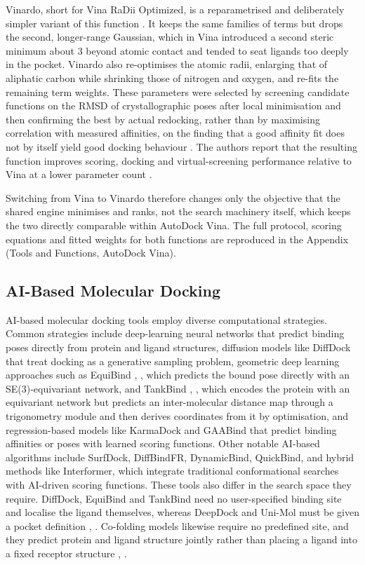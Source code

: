 Vinardo, short for Vina RaDii Optimized, is a reparametrised and deliberately simpler variant of this function \cite{ref073}. It keeps the same families of terms but drops the second, longer-range Gaussian, which in Vina introduced a second steric minimum about 3\angstrom{} beyond atomic contact and tended to seat ligands too deeply in the pocket. Vinardo also re-optimises the atomic radii, enlarging that of aliphatic carbon while shrinking those of nitrogen and oxygen, and re-fits the remaining term weights. These parameters were selected by screening candidate functions on the RMSD of crystallographic poses after local minimisation and then confirming the best by actual redocking, rather than by maximising correlation with measured affinities, on the finding that a good affinity fit does not by itself yield good docking behaviour \cite{ref073}. The authors report that the resulting function improves scoring, docking and virtual-screening performance relative to Vina at a lower parameter count \cite{ref073}.

Switching from Vina to Vinardo therefore changes only the objective that the shared engine minimises and ranks, not the search machinery itself, which keeps the two directly comparable within AutoDock Vina. The full protocol, scoring equations and fitted weights for both functions are reproduced in the Appendix (Tools and Functions, AutoDock Vina).

\hypertarget{ai-based-molecular-docking}{%
\subsection{AI-Based Molecular Docking}\label{ai-based-molecular-docking}}

AI-based molecular docking tools employ diverse computational strategies. Common strategies include deep-learning neural networks that predict binding poses directly from protein and ligand structures, diffusion models like DiffDock \cite{ref024} that treat docking as a generative sampling problem, geometric deep learning approaches such as EquiBind \cite{ref009}, \cite{ref010}, which predicts the bound pose directly with an SE(3)-equivariant network, and TankBind \cite{ref025}, \cite{ref026}, which encodes the protein with an equivariant network but predicts an inter-molecular distance map through a trigonometry module and then derives coordinates from it by optimisation, and regression-based models like KarmaDock \cite{ref027} and GAABind \cite{ref028} that predict binding affinities or poses with learned scoring functions. Other notable AI-based algorithms include SurfDock, DiffBindFR, DynamicBind, QuickBind, and hybrid methods like Interformer, which integrate traditional conformational searches with AI-driven scoring functions. These tools also differ in the search space they require. DiffDock, EquiBind and TankBind need no user-specified binding site and localise the ligand themselves, whereas DeepDock and Uni-Mol must be given a pocket definition \cite{ref012}, \cite{ref035}. Co-folding models likewise require no predefined site, and they predict protein and ligand structure jointly rather than placing a ligand into a fixed receptor structure \cite{ref012}, \cite{ref029}.

